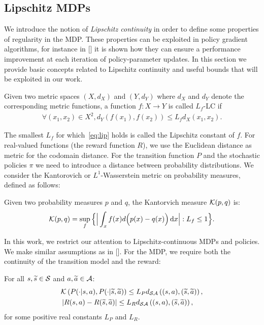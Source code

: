 \subsection{Lipschitz \ac{MDPs}}
We introduce the notion of \emph{Lipschitz continuity} in order to define some properties of regularity in the \ac{MDP}. These properties can be exploited in policy gradient algorithms, for instance in [\citet{pirotta2015policy}] it is shown how they can ensure a performance improvement at each iteration of policy-parameter updates. In this section we provide basic concepts related to Lipschitz continuity and useful bounds that will be exploited in our work.
\begin{definition}
Given two metric spaces $(X, d_X)$ and $(Y, d_Y)$ where $d_X$ and $d_Y$ denote the corresponding metric functions, a function $f: X \rightarrow Y$ is called $L_f$-\acf{LC} if
\begin{align} \forall(x_1, x_2) \in X^2, d_Y(f(x_1), f(x_2)) \leq L_f d_X(x_1, x_2). \label{eq:lip} \end{align}
\end{definition}
\noindent The smallest $L_f$ for which~\eqref{eq:lip} holds is called the Lipschitz constant of $f$. For real-valued functions (\eg the reward function $R$), we use the Euclidean distance as metric for the codomain distance. For the transition function $P$ and the stochastic policies $\pi$ we need to introduce a distance between probability distributions. We consider the Kantorovich or $L^1$-Wasserstein metric on probability measures, defined as follows:
\begin{definition}
Given two probability measures $p$ and $q$, the Kantorvich measure $\mathcal{K}(p, q)$ is:
\begin{align} \mathcal{K}(p, q) = \sup_f\Big\{ \Big| \int_x f(x) d\Big(p(x)-q(x)\Big) \,\mathrm{d} x \Big|: L_f \leq 1 \Big\}. \end{align}
\end{definition}
\noindent In this work, we restrict our attention to Lipschitz-continuous MDPs and policies. We make similar assumptions as in [\cite{pirotta2015policy}]. For the MDP, we require both the continuity of the transition model and the reward:
%
\begin{assumption}\label{ass:lipmdp}
	For all $s,\widetilde{s}\in\mathcal{S}$ and $a,\widetilde{a}\in\mathcal{A}$:
	\begin{align}
	&\mathcal{K}\left(P(\cdot|s,a), P(\cdot| \widetilde{s},\widetilde{a})\right) \leq L_{P}d_{\mathcal{S}\mathcal{A}}\left((s,a),(\widetilde{s},\widetilde{a})\right), \\
	&\left|R(s,a) - R(\widetilde{s},\widetilde{a})\right| \leq L_{R}d_{\mathcal{S}\mathcal{A}}\left((s,a),(\widetilde{s},\widetilde{a})\right),
	\end{align}
	for some positive real constants $L_{P}$ and $L_{R}$.
\end{assumption}
